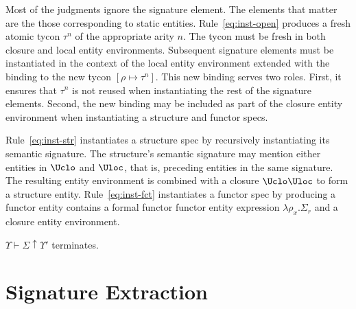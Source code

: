 \documentclass[9pt,nocopyrightspace, fleqn]{sigplanconf}
\begin{document}
Most of the
judgments ignore the signature element. The elements that matter are
the those corresponding to static entities. Rule~\ref{eq:inst-open}
produces a fresh atomic tycon $\tau^n$ of the appropriate arity
$n$. The tycon must be fresh in both closure and local entity
environments. Subsequent signature elements must be instantiated in
the context of the local entity environment extended with the binding
to the new tycon $[\rho\mapsto\tau^n]$. This new binding serves two
roles. First, it ensures that $\tau^n$ is not reused when
instantiating the rest of the signature elements. Second, the new
binding may be included as part of the closure entity environment when
instantiating a structure and functor specs.  

Rule~\ref{eq:inst-str} instantiates a structure spec by recursively
instantiating its semantic signature. The structure's semantic signature may mention
either entities in $\Uclo$ and $\Uloc$, that is,
preceding entities in the same signature. The resulting entity environment
is combined with a closure $\Uclo\Uloc$ to form a
structure entity. Rule~\ref{eq:inst-fct} instantiates a functor spec
by producing a functor entity contains a formal functor functor entity
expression $\lambda\rho_x.\Sigma_r$ and a closure entity
environment. 

\begin{lemma}
$\Upsilon\vdash \Sigma \uparrow \Upsilon'$ terminates.
\end{lemma}



\section{Signature Extraction}\label{sec:sigextract}
\end{document}
